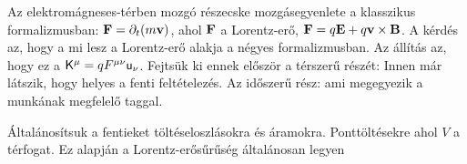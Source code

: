    Az elektromágneses-térben mozgó részecske mozgásegyenlete a klasszikus formalizmusban: $\mathbf{F}=\partial_t(m\mathbf{v})$, ahol $\mathbf{F}$ a Lorentz-erő, $\mathbf{F}=q\mathbf{E}+q\mathbf{v}\times\mathbf{B}$. A kérdés az, hogy a mi lesz a Lorentz-erő alakja a négyes formalizmusban. Az állítás az, hogy ez a $\mathsf{K}^\mu=qF^{\mu\nu}\mathsf{u}_\nu$. Fejtsük ki ennek először a térszerű részét:
   Innen már látszik, hogy helyes a fenti feltételezés. Az időszerű rész:
   ami megegyezik a munkának megfelelő taggal. 
   
   Általánosítsuk a fentieket töltéseloszlásokra és áramokra. Ponttöltésekre 
   ahol $V$ a térfogat.
   Ez alapján a Lorentz-erősűrűség általánosan legyen 
   
